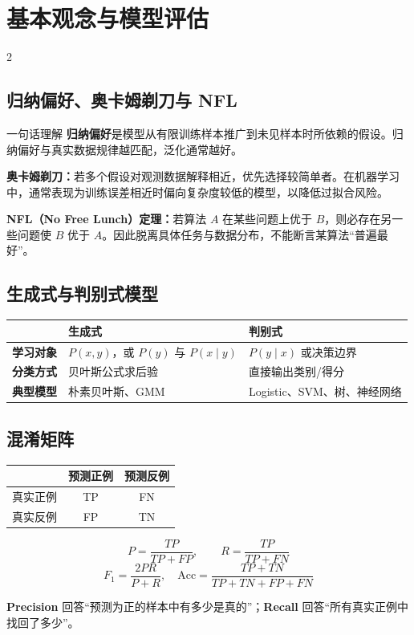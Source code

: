 \documentclass[9pt,a4paper,UTF8]{ctexart}
\newcommand{\term}[1]{\textbf{\color{teal}#1}}
\begin{document}
\section{基本观念与模型评估}
\begin{multicols}{2}
\subsection{归纳偏好、奥卡姆剃刀与 NFL}
\begin{keybox}{一句话理解}
\term{归纳偏好}是模型从有限训练样本推广到未见样本时所依赖的假设。归纳偏好与真实数据规律越匹配，泛化通常越好。
\end{keybox}
\textbf{奥卡姆剃刀：}若多个假设对观测数据解释相近，优先选择较简单者。在机器学习中，通常表现为训练误差相近时偏向复杂度较低的模型，以降低过拟合风险。

\textbf{NFL（No Free Lunch）定理：}若算法 $A$ 在某些问题上优于 $B$，则必存在另一些问题使 $B$ 优于 $A$。因此脱离具体任务与数据分布，不能断言某算法“普遍最好”。

\subsection{生成式与判别式模型}
\begin{tabularx}{\columnwidth}{>{\bfseries}p{}XX}
\toprule
 & 生成式 & 判别式\\
\midrule
学习对象 & $P(x,y)$，或 $P(y)$ 与 $P(x\mid y)$ & $P(y\mid x)$ 或决策边界\\
分类方式 & 贝叶斯公式求后验 & 直接输出类别/得分\\
典型模型 & 朴素贝叶斯、GMM & Logistic、SVM、树、神经网络\\
\bottomrule
\end{tabularx}

\subsection{混淆矩阵}
\begin{center}
\begin{tabular}{c|cc}
\toprule
& 预测正例 & 预测反例\\\midrule
真实正例 & TP & FN\\
真实反例 & FP & TN\\\bottomrule
\end{tabular}
\end{center}
\begin{formbox}
\[
P=\frac{TP}{TP+FP},\qquad R=\frac{TP}{TP+FN}
\]
\[
F_1=\frac{2PR}{P+R},\quad
\mathrm{Acc}=\frac{TP+TN}{TP+TN+FP+FN}
\]
\end{formbox}
\textbf{Precision} 回答“预测为正的样本中有多少是真的”；\textbf{Recall} 回答“所有真实正例中找回了多少”。


\end{multicols}
\end{document}
